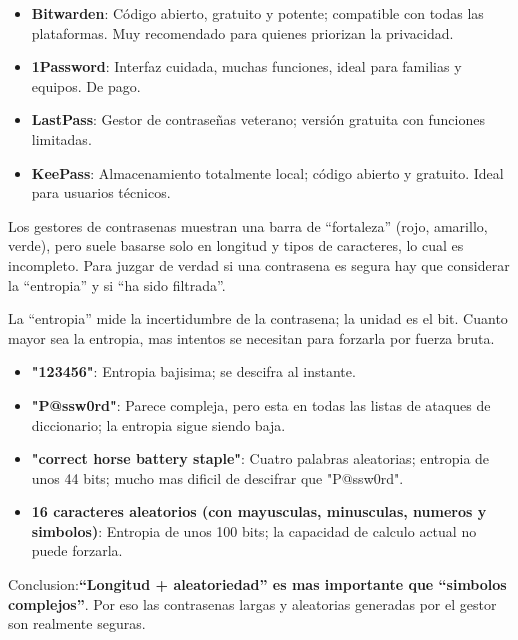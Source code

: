 
\begin{itemize}
  \item \textbf{Bitwarden}: Código abierto, gratuito y potente; compatible con todas las plataformas. Muy recomendado para quienes priorizan la privacidad.
  \item \textbf{1Password}: Interfaz cuidada, muchas funciones, ideal para familias y equipos. De pago.
  \item \textbf{LastPass}: Gestor de contraseñas veterano; versión gratuita con funciones limitadas.
  \item \textbf{KeePass}: Almacenamiento totalmente local; código abierto y gratuito. Ideal para usuarios técnicos.
\end{itemize}


Los gestores de contrasenas muestran una barra de “fortaleza” (rojo, amarillo, verde), pero suele basarse solo en longitud y tipos de caracteres, lo cual es incompleto. Para juzgar de verdad si una contrasena es segura hay que considerar la “entropia” y si “ha sido filtrada”.


La “entropia” mide la incertidumbre de la contrasena; la unidad es el bit. Cuanto mayor sea la entropia, mas intentos se necesitan para forzarla por fuerza bruta.

\begin{itemize}
  \item \textbf{"123456"}: Entropia bajisima; se descifra al instante.
  \item \textbf{"P@ssw0rd"}: Parece compleja, pero esta en todas las listas de ataques de diccionario; la entropia sigue siendo baja.
  \item \textbf{"correct horse battery staple"}: Cuatro palabras aleatorias; entropia de unos 44 bits; mucho mas dificil de descifrar que "P@ssw0rd".
  \item \textbf{16 caracteres aleatorios (con mayusculas, minusculas, numeros y simbolos)}: Entropia de unos 100 bits; la capacidad de calculo actual no puede forzarla.
\end{itemize}

Conclusion:\textbf{“Longitud + aleatoriedad” es mas importante que “simbolos complejos”}. Por eso las contrasenas largas y aleatorias generadas por el gestor son realmente seguras.


